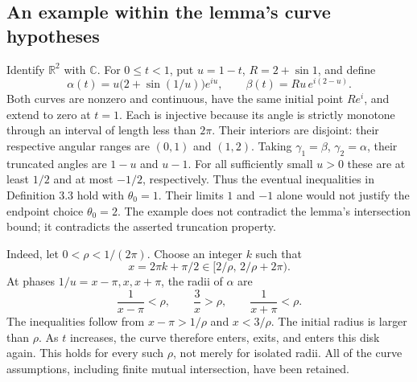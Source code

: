 \documentclass[10pt]{article}
\begin{document}
\subsection*{An example within the lemma’s curve hypotheses}
Identify \(\mathbb R^2\) with \(\mathbb C\). For \(0\le t<1\), put \(u=1-t\), \(R=2+\sin1\), and define \[\alpha(t)=u\bigl(2+\sin(1/u)\bigr)e^{iu},
 \qquad
 \beta(t)=Ru\,e^{i(2-u)}.\] Both curves are nonzero and continuous, have the same initial point \(Re^{i}\), and extend to zero at \(t=1\). Each is injective because its angle is strictly monotone through an interval of length less than \(2\pi\). Their interiors are disjoint: their respective angular ranges are \((0,1)\) and \((1,2)\). Taking \(\gamma_1=\beta\), \(\gamma_2=\alpha\), their truncated angles are \(1-u\) and \(u-1\). For all sufficiently small \(u>0\) these are at least \(1/2\) and at most \(-1/2\), respectively. Thus the eventual inequalities in Definition 3.3 hold with \(\theta_0=1\). Their limits \(1\) and \(-1\) alone would not justify the endpoint choice \(\theta_0=2\). The example does not contradict the lemma’s intersection bound; it contradicts the asserted truncation property.\par
Indeed, let \(0<\rho<1/(2\pi)\). Choose an integer \(k\) such that \[x=2\pi k+\pi/2\in[2/\rho,\,2/\rho+2\pi).\] At phases \(1/u=x-\pi,x,x+\pi\), the radii of \(\alpha\) are \[\frac1{x-\pi}<\rho,\qquad
 \frac3x>\rho,\qquad
 \frac1{x+\pi}<\rho.\] The inequalities follow from \(x-\pi>1/\rho\) and \(x<3/\rho\). The initial radius is larger than \(\rho\). As \(t\) increases, the curve therefore enters, exits, and enters this disk again. This holds for every such \(\rho\), not merely for isolated radii. All of the curve assumptions, including finite mutual intersection, have been retained.\par
\end{document}
